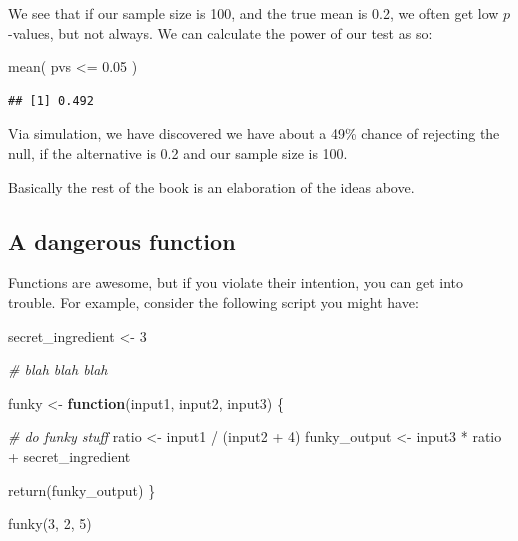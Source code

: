 \documentclass[
]{book}
\newenvironment{Shaded}{\begin{snugshade}}{\end{snugshade}}
\newcommand{\CommentTok}[1]{\textcolor[rgb]{0.56,0.35,0.01}{\textit{#1}}}
\newcommand{\ControlFlowTok}[1]{\textcolor[rgb]{0.13,0.29,0.53}{\textbf{#1}}}
\newcommand{\DecValTok}[1]{\textcolor[rgb]{0.00,0.00,0.81}{#1}}
\newcommand{\FloatTok}[1]{\textcolor[rgb]{0.00,0.00,0.81}{#1}}
\newcommand{\FunctionTok}[1]{\textcolor[rgb]{0.00,0.00,0.00}{#1}}
\newcommand{\NormalTok}[1]{#1}
\newcommand{\OtherTok}[1]{\textcolor[rgb]{0.56,0.35,0.01}{#1}}
\newcommand{\SpecialCharTok}[1]{\textcolor[rgb]{0.00,0.00,0.00}{#1}}
\begin{document}
We see that if our sample size is 100, and the true mean is 0.2, we often get low \(p\)-values, but not always. We can calculate the power of our test as so:

\begin{Shaded}
\begin{Highlighting}[]
\FunctionTok{mean}\NormalTok{( pvs }\SpecialCharTok{\textless{}=} \FloatTok{0.05}\NormalTok{ )}
\end{Highlighting}
\end{Shaded}

\begin{verbatim}
## [1] 0.492
\end{verbatim}

Via simulation, we have discovered we have about a 49\% chance of rejecting the null, if the alternative is 0.2 and our sample size is 100.

Basically the rest of the book is an elaboration of the ideas above.

\hypertarget{a-dangerous-function}{%
\subsection{A dangerous function}\label{a-dangerous-function}}

Functions are awesome, but if you violate their intention, you can get into trouble.
For example, consider the following script you might have:

\begin{Shaded}
\begin{Highlighting}[]
\NormalTok{secret\_ingredient }\OtherTok{\textless{}{-}} \DecValTok{3}

\CommentTok{\# blah blah blah}

\NormalTok{funky }\OtherTok{\textless{}{-}} \ControlFlowTok{function}\NormalTok{(input1, input2, input3) \{}
  
  \CommentTok{\# do funky stuff}
\NormalTok{  ratio }\OtherTok{\textless{}{-}}\NormalTok{ input1 }\SpecialCharTok{/}\NormalTok{ (input2 }\SpecialCharTok{+} \DecValTok{4}\NormalTok{)}
\NormalTok{  funky\_output }\OtherTok{\textless{}{-}}\NormalTok{ input3 }\SpecialCharTok{*}\NormalTok{ ratio }\SpecialCharTok{+}\NormalTok{ secret\_ingredient}
  
  \FunctionTok{return}\NormalTok{(funky\_output)  }
\NormalTok{\}}

\FunctionTok{funky}\NormalTok{(}\DecValTok{3}\NormalTok{, }\DecValTok{2}\NormalTok{, }\DecValTok{5}\NormalTok{)}
\end{Highlighting}
\end{Shaded}
\end{document}
